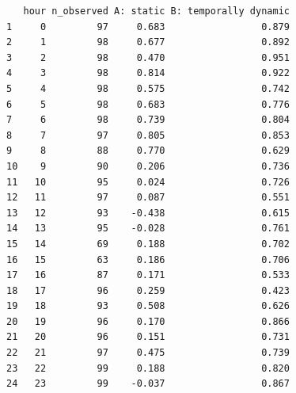 \documentclass[
  letterpaper,
  DIV=11,
  numbers=noendperiod]{scrartcl}
\begin{document}
\begin{verbatim}
   hour n_observed A: static B: temporally dynamic
1     0         97     0.683                 0.879
2     1         98     0.677                 0.892
3     2         98     0.470                 0.951
4     3         98     0.814                 0.922
5     4         98     0.575                 0.742
6     5         98     0.683                 0.776
7     6         98     0.739                 0.804
8     7         97     0.805                 0.853
9     8         88     0.770                 0.629
10    9         90     0.206                 0.736
11   10         95     0.024                 0.726
12   11         97     0.087                 0.551
13   12         93    -0.438                 0.615
14   13         95    -0.028                 0.761
15   14         69     0.188                 0.702
16   15         63     0.186                 0.706
17   16         87     0.171                 0.533
18   17         96     0.259                 0.423
19   18         93     0.508                 0.626
20   19         96     0.170                 0.866
21   20         96     0.151                 0.731
22   21         97     0.475                 0.739
23   22         99     0.188                 0.820
24   23         99    -0.037                 0.867
\end{verbatim}
\end{document}
